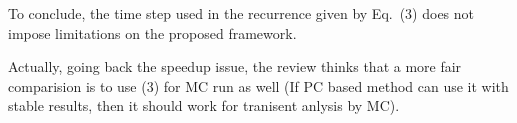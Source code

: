 \begin{authors}
To conclude, the time step used in the recurrence given by Eq.~(3) does not impose limitations on the proposed framework.

\begin{actions}
\end{actions}
\end{authors}

\begin{reviewer}
Actually, going back the speedup issue, the review thinks that a more fair comparision is to use (3) for MC run as well (If PC based method can use it with stable results, then it should work for tranisent anlysis by MC).
\end{reviewer}
